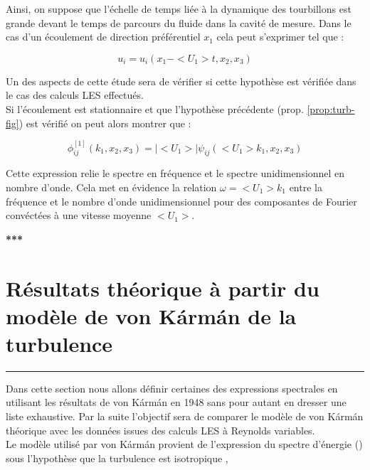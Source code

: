 \documentclass[12pt]{article}   %
\theoremstyle{plain}
\theoremstyle{remark}
\begin{document}
		Ainsi, on suppose que l'échelle de temps liée à la dynamique des tourbillons est grande devant le temps de parcours du fluide dans la cavité de mesure. Dans le cas d'un écoulement de direction préférentiel $x_1$ cela peut s'exprimer tel que :
		
		\begin{equation}
			u_i=u_i(x_1-<U_1>t,x_2,x_3)
		\end{equation}
	
		Un des aspects de cette étude sera de vérifier si cette hypothèse est vérifiée dans le cas des calculs LES effectués. \\
		
		Si l'écoulement est stationnaire et que l'hypothèse précédente (prop. \ref{prop:turb-fig}) est vérifié on peut alors montrer que :
		
		\begin{equation}
			\phi_{ij}^{[1]}(k_1,x_2,x_3)=|<U_1>|\psi_{ij}(<U_1>k_1,x_2,x_3)
			\label{fig:turb-fig}
		\end{equation}
	
		Cette expression relie le spectre en fréquence et le spectre unidimensionnel en nombre d'onde. Cela met en évidence la relation $\omega=<U_1>k_1$ entre la fréquence et le nombre d'onde unidimensionnel pour des composantes de Fourier convéctées à une vitesse moyenne $<U_1>$. 
		
		
\begin{center}
	\large {\bf{***}}
\end{center}

\vspace{0.3cm}
\section{Résultats théorique à partir du modèle de von Kármán de la turbulence}
\noindent\rule{\linewidth}{2pt}
\vspace{0.1cm}
		
	Dans cette section nous allons définir certaines des expressions spectrales en utilisant les résultats de von Kármán en 1948 \cite{vonkarman1948} sans pour autant en dresser une liste exhaustive. Par la suite l'objectif sera de comparer le modèle de von Kármán théorique avec les données issues des calculs LES à Reynolds variables. \\
	
	Le modèle utilisé par von Kármán provient de l'expression du spectre d'énergie () sous l'hypothèse que la turbulence est isotropique \cite{wilson1998turbulence},
	
\end{document}
